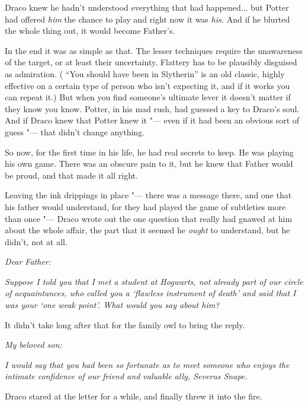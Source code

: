 Draco knew he hadn't understood everything that had happened... but
Potter had offered \emph{him} the chance to play and right now it was
\emph{his.} And if he blurted the whole thing out, it would become
Father's.

In the end it was as simple as that. The lesser techniques require the
unawareness of the target, or at least their uncertainty. Flattery has
to be plausibly disguised as admiration. ( ``You should have been in
Slytherin'' is an old classic, highly effective on a certain type of
person who isn't expecting it, and if it works you can repeat it.) But
when you find someone's ultimate lever it doesn't matter if they know
you know. Potter, in his mad rush, had guessed a key to Draco's soul.
And if Draco knew that Potter knew it "--- even if it had been an obvious
sort of guess "--- that didn't change anything.

So now, for the first time in his life, he had real secrets to keep. He
was playing his own game. There was an obscure pain to it, but he knew
that Father would be proud, and that made it all right.

Leaving the ink drippings in place "--- there was a message there, and one
that his father would understand, for they had played the game of
subtleties more than once "--- Draco wrote out the one question that really
had gnawed at him about the whole affair, the part that it seemed he
\emph{ought} to understand, but he didn't, not at all.

\emph{Dear Father:}

\emph{Suppose I told you that I met a student at Hogwarts, not already
part of our circle of acquaintances, who called you a `flawless
instrument of death' and said that I was your `one weak point'. What
would you say about him?}

It didn't take long after that for the family owl to bring the reply.

\emph{My beloved son:}

\emph{I would say that you had been so fortunate as to meet someone who
enjoys the intimate confidence of our friend and valuable ally, Severus
Snape.}

Draco stared at the letter for a while, and finally threw it into the
fire.
